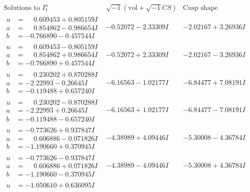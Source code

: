 \documentclass[1p]{elsarticle_modified}
\theoremstyle{definition}
\newcommand{\I}{\sqrt{-1}}
\begin{document}
$$\begin{array}{c|c|c}  
\text{Solutions to }I^u_{1}& \I (\text{vol} + \sqrt{-1}CS) & \text{Cusp shape}\\
 \hline 
\begin{aligned}
u &= \phantom{-}0.609453 + 0.805159 I \\
a &= \phantom{-}0.854862 - 0.986654 I \\
b &= -0.766890 - 0.457544 I\end{aligned}
 & -0.52072 - 2.33309 I & -2.02167 + 3.26936 I \\ \hline\begin{aligned}
u &= \phantom{-}0.609453 - 0.805159 I \\
a &= \phantom{-}0.854862 + 0.986654 I \\
b &= -0.766890 + 0.457544 I\end{aligned}
 & -0.52072 + 2.33309 I & -2.02167 - 3.26936 I \\ \hline\begin{aligned}
u &= \phantom{-}0.230202 + 0.870288 I \\
a &= -2.22993 - 0.26645 I \\
b &= -0.119488 + 0.657240 I\end{aligned}
 & -6.16563 - 1.02177 I & -6.84477 + 7.08191 I \\ \hline\begin{aligned}
u &= \phantom{-}0.230202 - 0.870288 I \\
a &= -2.22993 + 0.26645 I \\
b &= -0.119488 - 0.657240 I\end{aligned}
 & -6.16563 + 1.02177 I & -6.84477 - 7.08191 I \\ \hline\begin{aligned}
u &= -0.773626 + 0.937847 I \\
a &= \phantom{-}0.606886 - 0.071826 I \\
b &= -1.190660 + 0.370945 I\end{aligned}
 & -4.38989 + 4.09446 I & -5.30008 - 4.36784 I \\ \hline\begin{aligned}
u &= -0.773626 - 0.937847 I \\
a &= \phantom{-}0.606886 + 0.071826 I \\
b &= -1.190660 - 0.370945 I\end{aligned}
 & -4.38989 - 4.09446 I & -5.30008 + 4.36784 I \\ \hline\begin{aligned}
u &= -1.050610 + 0.636095 I \\

\end{aligned}
\end{array}$$
\end{document}
